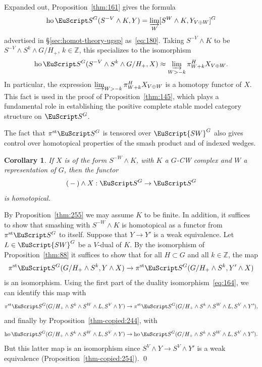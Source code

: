 \documentclass{amsart}
\newtheorem{cor}[equation]{Corollary}
\theoremstyle{definition}
\theoremstyle{remark}
\newenvironment{pf}{\bigskip{\em Proof:\/}}{\qed\medskip}
\newcommand{\Z}{{\mathbb Z}}
\newcommand{\slot}{\,-\,}
\newcommand{\spectra}{\EuScript S}
\newcommand{\swg}[1]{\EuScript {SW}^{#1}}
\DeclareMathOperator{\ho}{ho}
\newcommand{\ugspectra}[1]{\spectra^{#1}}
\newcommand{\pist}{\pi^{\text{st}}}
\begin{document}
Expanded out, Proposition~\ref{thm:161} gives the formula
\[
\ho\ugspectra{G}(S^{-V}\wedge K,Y) = \varinjlim_{W}[S^{W}\wedge
K,Y_{V\oplus W}]^{G}
\]
advertised in \S\ref{sec:homot-theory-ugsp} as~\eqref{eq:180}.   Taking
$S^{-V}\wedge K$ to be $S^{-V}\wedge S^{k}\wedge G/H_{+}$, $k\in
\Z$, this specializes to the isomorphism
\begin{equation}
\label{eq:179}
\ho\ugspectra{G}(S^{-V}\wedge S^{k}\wedge G/H_{+},X) \approx
\varinjlim_{W>-k}\pi^{H}_{W+k}X_{V\oplus W}.
\end{equation}
In particular, the expression
$\varinjlim_{W>-k}\pi^{H}_{W+k}X_{V\oplus W}$ is a homotopy functor of
$X$.  This fact is used in the proof of Proposition~\ref{thm:145},
which plays a fundamental role in establishing the positive complete
stable model category structure on $\ugspectra{G}$.

The fact that $\pist\ugspectra{G}$ is tensored over $\swg{G}$ also
gives control over homotopical properties of the smash product and of
indexed wedges.

\begin{cor}
\label{thm:132} If $X$ is of the form $S^{-W}\wedge K$, with $K$ a
$G$-CW complex and $W$ a representation of $G$, then the functor 
\[
(\slot)\wedge X:\ugspectra{G}\to \ugspectra{G}
\]
is homotopical.
\end{cor}

\begin{pf}
By Proposition~\ref{thm:255} we may assume $K$ to be finite.  In
addition, it suffices to show that smashing with $S^{-W}\wedge K$ is
homotopical as a functor from $\pist\ugspectra{G}$ to itself.  Suppose
that $Y\to Y'$ is a weak equivalence.  Let $L\in\swg{G}$ be a $V$-dual
of $K$.  By the isomorphism of Proposition~\ref{thm:88} it suffices to
show that for all $H\subset G$ and all $k\in\Z$, the map
\[
\pist\ugspectra{G}(G/H_{+}\wedge S^{k},Y\wedge X)\to
\pist\ugspectra{G}(G/H_{+}\wedge S^{k},Y'\wedge X)
\]
is an isomorphism.  Using the first part of the duality
isomorphism~\eqref{eq:164}, we can identify this map with
\[
\pist\ugspectra{G}(G/H_{+}\wedge S^{k}\wedge S^{W}\wedge L,S^{V}\wedge
Y)\to
\pist\ugspectra{G}(G/H_{+}\wedge S^{k}\wedge S^{W}\wedge L,S^{V}\wedge
Y'),
\]
and finally by Proposition~\ref{thm-copied:244}, with 
\[
\ho\ugspectra{G}(G/H_{+}\wedge S^{k}\wedge S^{W}\wedge L,S^{V}\wedge
Y)\to
\ho\ugspectra{G}(G/H_{+}\wedge S^{k}\wedge S^{W}\wedge L,S^{V}\wedge
Y').
\]
But this latter map is an isomorphism since $S^{V}\wedge Y\to
S^{V}\wedge Y'$ is a weak equivalence (Proposition~\ref{thm-copied:254}).
\end{pf}
\end{document}
